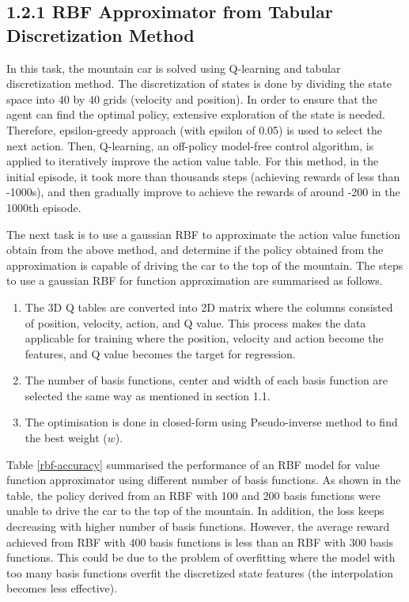 \documentclass[12pt,letterpaper]{article}
\newenvironment{myitemize}
{ \begin{enumerate}
    \setlength{\itemsep}{1pt}
    \setlength{\parskip}{1pt}
    \setlength{\parsep}{1pt}     }
{ \end{enumerate}         }
\begin{document}
\subsection*{1.2.1 RBF Approximator from Tabular Discretization Method}

In this task, the mountain car is solved using Q-learning and tabular discretization method. 
The discretization of states is done by dividing the state space into 40 by 40 grids (velocity and position). 
In order to ensure that the agent can find the optimal policy, extensive exploration of the state is needed.
Therefore, epsilon-greedy approach (with epsilon of 0.05) is used to select the next action.
Then, Q-learning, an off-policy model-free control algorithm, is applied to iteratively improve the action value table.
For this method, in the initial episode, it took more than thousands steps (achieving rewards of less than -1000s), 
and then gradually improve to achieve the rewards of around -200 in the 1000th episode. 

The next task is to use a gaussian RBF to approximate the action value function obtain from the above method, 
and determine if the policy obtained from the approximation is capable of driving the car to the top of the mountain.
The steps to use a gaussian RBF for function approximation are summarised as follows.

\vspace{-1em}
\begin{myitemize}
  \item The 3D Q tables are converted into 2D matrix where the columns consisted of position, velocity, action, and Q value.
        This process makes the data applicable for training where the position, velocity and action become the features, 
        and Q value becomes the target for regression.
  \item The number of basis functions, center and width of each basis function are selected the same way as mentioned in section 1.1.
  \item The optimisation is done in closed-form using Pseudo-inverse method to find the best weight ($w$).
\end{myitemize}    
\vspace{-1em}
Table \ref{rbf-accuracy} summarised the performance of an RBF model for value function approximator using different number of basis functions.
As shown in the table, the policy derived from an RBF with 100 and 200 basis functions were unable to drive the car to the top of the mountain.
In addition, the loss keeps decreasing with higher number of basis functions.
However, the average reward achieved from RBF with 400 basis functions is less than an RBF with 300 basis functions.
This could be due to the problem of overfitting where the model with too many basis functions overfit the discretized state features (the interpolation becomes less effective).
\end{document}
